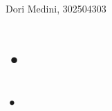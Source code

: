 \documentclass[11]{article}
\begin{document}
\begin{center}

{Dori Medini, 302504303}

\end{center}

\section{•}
\subsection{•}
\end{document}
